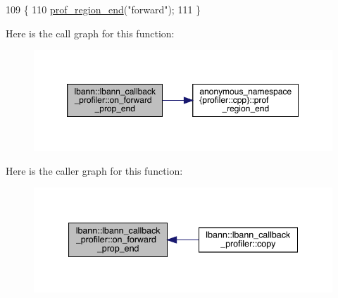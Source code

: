 \begin{DoxyCode}
109                                                           \{
110   \hyperlink{namespaceanonymous__namespace_02profiler_8cpp_03_a7984c26fb186307873a2f83f91715a99}{prof\_region\_end}(\textcolor{stringliteral}{"forward"});
111 \}
\end{DoxyCode}
Here is the call graph for this function\+:\nopagebreak
\begin{figure}[H]
\begin{center}
\leavevmode
\includegraphics[width=350pt]{classlbann_1_1lbann__callback__profiler_a63e3ad301cf8529acda00ac8f2531c93_cgraph}
\end{center}
\end{figure}
Here is the caller graph for this function\+:\nopagebreak
\begin{figure}[H]
\begin{center}
\leavevmode
\includegraphics[width=340pt]{classlbann_1_1lbann__callback__profiler_a63e3ad301cf8529acda00ac8f2531c93_icgraph}
\end{center}
\end{figure}
\mbox{\label{classlbann_1_1lbann__callback__profiler_a6cfc4cf84fe4229f627d18ad19eaa415}} 
